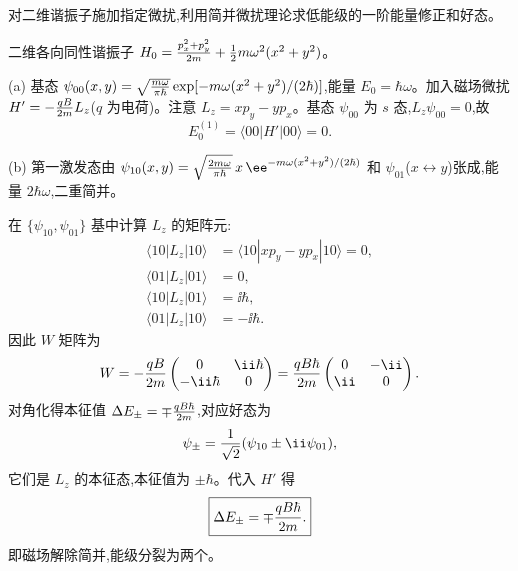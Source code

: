 \begin{question}
对二维谐振子施加指定微扰,利用简并微扰理论求低能级的一阶能量修正和好态。
\end{question}
\begin{solution}
二维各向同性谐振子 $H_0 = {p_x^2+p_y^2\over2m}+{1\over2}m\omega^2(x^2+y^2)$。

(a) 基态 $\psi_{00}(x,y)=\sqrt{m\omega\over\pi\hbar}\exp[-m\omega(x^2+y^2)/(2\hbar)]$,能量 $E_0=\hbar\omega$。加入磁场微扰 $H' = -{qB\over2m}L_z$($q$ 为电荷)。注意 $L_z = xp_y - yp_x$。基态 $\psi_{00}$ 为 $s$ 态,$L_z\psi_{00}=0$,故
\[
E_0^{(1)}=\langle00|H'|00\rangle=0.
\]

(b) 第一激发态由 $\psi_{10}(x,y)=\sqrt{2m\omega\over\pi\hbar}\,x\,\ee^{-m\omega(x^2+y^2)/(2\hbar)}$ 和 $\psi_{01}$($x\leftrightarrow y$)张成,能量 $2\hbar\omega$,二重简并。

在 $\{\psi_{10},\psi_{01}\}$ 基中计算 $L_z$ 的矩阵元:
\[
\begin{aligned}
\langle10|L_z|10\rangle &= \langle10|xp_y-yp_x|10\rangle = 0,\\
\langle01|L_z|01\rangle &= 0,\\
\langle10|L_z|01\rangle &= \ii\hbar,\\
\langle01|L_z|10\rangle &= -\ii\hbar.
\end{aligned}
\]
因此 $W$ 矩阵为
\[
W = -{qB\over2m}\begin{pmatrix}0 & \ii\hbar\\ -\ii\hbar & 0\end{pmatrix}
= {qB\hbar\over2m}\begin{pmatrix}0 & -\ii\\ \ii & 0\end{pmatrix}.
\]
对角化得本征值 $\Delta E_\pm = \mp {qB\hbar\over2m}$,对应好态为
\[
\psi_\pm = {1\over\sqrt2}(\psi_{10} \pm \ii\psi_{01}),
\]
它们是 $L_z$ 的本征态,本征值为 $\pm\hbar$。代入 $H'$ 得
\[
\boxed{\Delta E_\pm = \mp {qB\hbar\over2m}.}
\]
即磁场解除简并,能级分裂为两个。
\end{solution}

